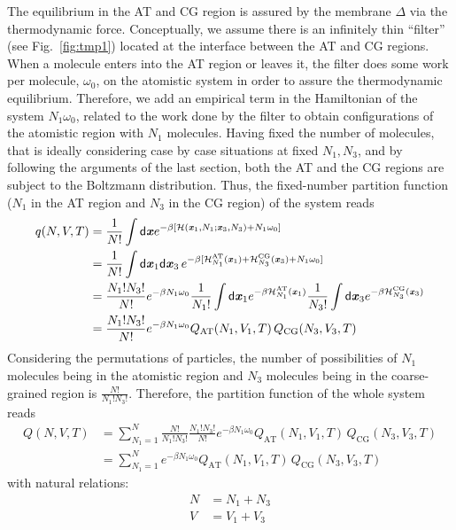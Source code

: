 \documentclass[aip,jcp,a4paper,reprint,onecolumn]{revtex4-1}
\newcommand{\vect}[1]{\textbf{\textit{#1}}}
\newcommand{\dd}[1]{\textsf{#1}}
\newcommand{\AT}{{\textrm{{AT}}}}
\newcommand{\CG}{{\textrm{CG}}}
\newcommand{\HY}{{\Delta}}
\begin{document}
The equilibrium in the AT and CG region is assured by the membrane $\HY$ via the thermodynamic force. Conceptually, we assume there is an infinitely thin
``filter'' (see Fig.~\ref{fig:tmp1}) located at the interface between
the AT and CG regions. When a molecule enters into
the AT region or leaves it, the filter does some work per molecule, $\omega_0$, on the atomistic system in order to assure the thermodynamic equilibrium.
Therefore, we add an empirical term in the Hamiltonian of the system
$N_1\omega_0$, related to the work done  by the filter to obtain configurations of the atomistic region with $N_{1}$ molecules. 
Having fixed the number of molecules, that is ideally considering case by case situations at fixed $N_{1},N_{3}$, and by following the
arguments of the last section, both the AT and the CG regions are
subject to the Boltzmann distribution.
Thus, the fixed-number partition function ($N_1$ in the AT region and $N_3$ in the CG region) of the system reads
\begin{align}\nonumber
  q(N,V,T)
  &= \frac1{N!}\int
  \dd d\vect x
  e^{-\beta
    [\mathcal H(\vect x_1, N_1; \vect x_3, N_3) +
    N_1\omega_0]}\\\nonumber
  &= \frac1{N!}\int
  \dd d\vect x_1\dd d\vect x_3\,
  e^{-\beta
    [\mathcal H_{N_1}^{\AT}(\vect x_1) +
    \mathcal H_{N_3}^{\CG}(\vect x_3) +
    N_1\omega_0]}\\\nonumber
  & = \frac{N_1!N_3!}{N!}
  e^{-\beta N_1\omega_0}
  \frac{1}{N_1!}\int\dd d\vect x_1 e^{-\beta\mathcal H_{N_1}^{\AT}(\vect x_1)}
  \frac{1}{N_3!}\int\dd d\vect x_3 e^{-\beta\mathcal H_{N_3}^{\CG}(\vect x_3)}\\
  & = \frac{N_1!N_3!}{N!}
  e^{-\beta N_1\omega_0}
  Q_{\AT}(N_1, V_1, T)\,
  Q_{\CG}(N_3, V_3, T) 
\end{align}
Considering the permutations of particles, the number of possibilities of
$N_1$ molecules being in the atomistic region and $N_3$ molecules being
in the coarse-grained region is  $\frac{N!}{N_1!N_3!}$.
Therefore, the partition function of the whole system reads
\begin{align}\nonumber
  Q(N,V,T) &= \sum_{N_1=1}^N
  \frac{N!}{N_1!N_3!} \frac{N_1!N_3!}{N!}
  e^{-\beta N_1\omega_0}
  Q_{\AT}(N_1, V_1, T)\,
  Q_{\CG}(N_3, V_3, T) \\
  &= \sum_{N_1=1}^N
  e^{-\beta N_1\omega_0}
  Q_{\AT}(N_1, V_1, T)\,
  Q_{\CG}(N_3, V_3, T) 
\end{align}
with natural relations:
\begin{align}
  N &= N_1 + N_3\\
  V &= V_1 + V_3
\end{align}
\end{document}
